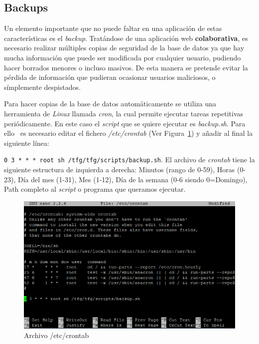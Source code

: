 \documentclass[a4paper, 12pt]{book}
\begin{document}
\subsection{Backups} 
\label{subsec:backups}

Un elemento importante que no puede faltar en una aplicación de estas características es el \textit{backup}. Tratándose de una aplicación web \textbf{colaborativa}, es necesario realizar múltiples copias de seguridad de la base de datos ya que hay mucha información que puede ser modificada por cualquier usuario, pudiendo hacer borrados menores o incluso masivos. De esta manera se pretende evitar la pérdida de información que pudieran ocasionar usuarios maliciosos, o símplemente despistados. 
\newline

Para hacer copias de la base de datos automáticamente se utiliza una herramienta de \textit{Linux} llamada \textit{cron}, la cual permite ejecutar tareas repetitivas periódicamente. En este caso el  \textit{script} que se quiere ejecutar es \textit{backup.sh}. Para ello~\cite{pagina-crontab} es necesario editar el fichero \textit{/etc/crontab} (Ver Figura~\ref{fig:crontab}) y añadir al final la siguiente línea: 

\verb|0 3 * * * root sh /tfg/tfg/scripts/backup.sh|. El archivo de \textit{crontab} tiene la siguiente estructura de izquierda a derecha: Minutos (rango de 0-59), Horas (0-23), Día del mes (1-31), Mes (1-12), Día de la semana (0-6 siendo 0=Domingo), Path completo al \textit{script} o programa que queramos ejecutar.

\begin{figure}[H]
  \centering
  \includegraphics[width=14cm, keepaspectratio]{img/crontab.png}
  \caption{Archivo /etc/crontab}
  \label{fig:crontab}
\end{figure}
\end{document}
